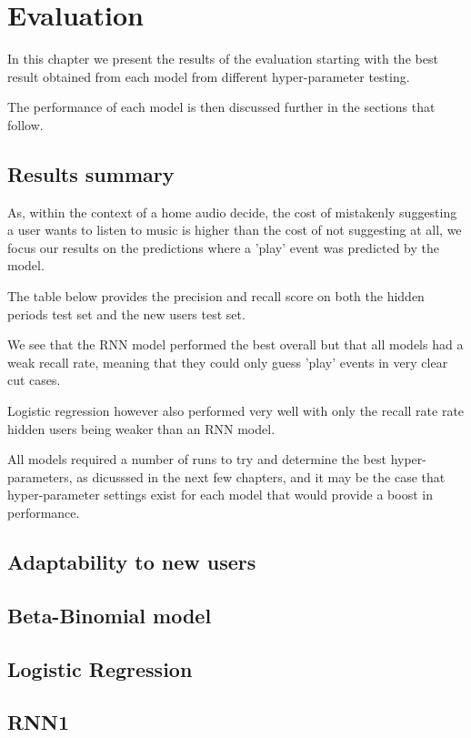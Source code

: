 
\chapter{Evaluation} %

\label{Chapter5} %

In this chapter we present the results of the evaluation starting with the best result obtained from each model from different hyper-parameter testing.

The performance of each model is then discussed further in the sections that follow. 

\section{Results summary}

As, within the context of a home audio decide, the cost of mistakenly suggesting a user wants to listen to music is higher than the cost of not suggesting at all, we focus our results on the predictions where a 'play' event was predicted by the model.

The table below provides the precision and recall score on both the hidden periods test set and the new users test set. 

We see that the RNN model performed the best overall but that all models had a weak recall rate, meaning that they could only guess 'play' events in very clear cut cases. 

Logistic regression however also performed very well with only the recall rate rate hidden users being weaker than an RNN model.

All models required a number of runs to try and determine the best hyper-parameters, as dicusssed in the next few chapters, and it may be the case that hyper-parameter settings exist for each model that would provide a boost in performance.

\section{Adaptability to new users}

\section{Beta-Binomial model}

\section{Logistic Regression}

\section{RNN1}